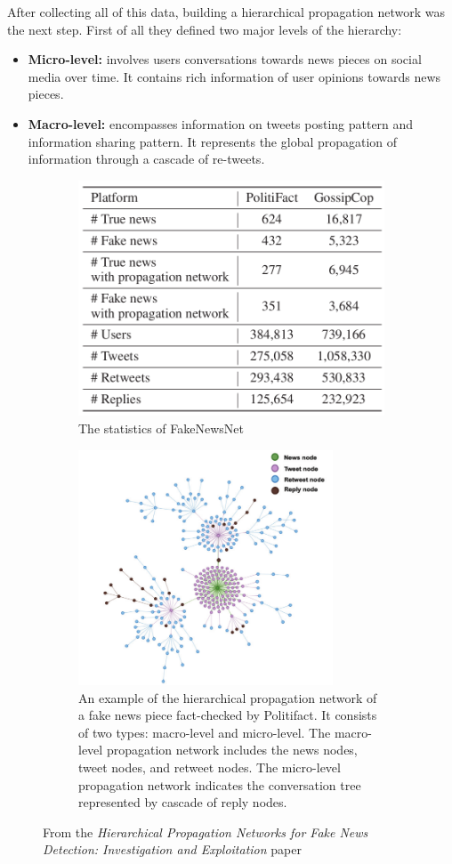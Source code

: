 \documentclass[10pt, english]{report}
\begin{document}
After collecting all of this data, building a hierarchical propagation network was the next step. First of all they defined two major levels of the hierarchy: 

\begin{itemize}
\item \textbf{Micro-level:} involves users conversations towards news pieces on social media over time. It contains rich information of user opinions towards news pieces.
\item \textbf{Macro-level:} encompasses information on tweets posting pattern and information sharing pattern. It represents the global propagation of information through a cascade of re-tweets.
\end{itemize}

\begin{figure}[H]%
	\centering
	\begin{subfigure}{.5\textwidth}
		\includegraphics[width=.9\linewidth, height=7cm]{img/fake_news_net_content.png}
		\caption{The statistics of FakeNewsNet}
	\end{subfigure}%
	\begin{subfigure}{.5\textwidth}
		\includegraphics[width=.9\linewidth, height=7cm]{img/hierarchy_network.png}
		\caption{An example of the hierarchical propagation network of a fake news piece fact-checked by Politifact. It consists of two types: macro-level and micro-level. The macro-level propagation network includes the news nodes, tweet nodes, and retweet nodes. The micro-level propagation network indicates the conversation tree represented by cascade of reply nodes.}
	\end{subfigure}
	\caption{From the \textit{Hierarchical Propagation Networks for Fake News Detection: Investigation and Exploitation} paper}%
\end{figure}
\end{document}
